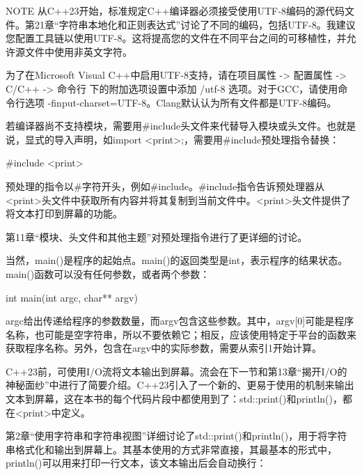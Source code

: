\begin{myNotic}{NOTE}
从C++23开始，标准规定C++编译器必须接受使用UTF-8编码的源代码文件。第21章“字符串本地化和正则表达式”讨论了不同的编码，包括UTF-8。我建议您配置工具链以使用UTF-8。这将提高您的文件在不同平台之间的可移植性，并允许源文件中使用非英文字符。

为了在Microsoft Visual C++中启用UTF-8支持，请在项目属性 -> 配置属性 -> C/C++ -> 命令行 下的附加选项设置中添加 /utf-8 选项。对于GCC，请使用命令行选项 -finput-charset=UTF-8。Clang默认认为所有文件都是UTF-8编码。
\end{myNotic}


若编译器尚不支持模块，需要用\#include头文件来代替导入模块或头文件。也就是说，显式的导入声明，如import <print>;，需要用\#include预处理指令替换：

\begin{cpp}
#include <print>
\end{cpp}

预处理的指令以\#字符开头，例如\#include。\#include指令告诉预处理器从<print>头文件中获取所有内容并将其复制到当前文件中。<print>头文件提供了将文本打印到屏幕的功能。

第11章“模块、头文件和其他主题”对预处理指令进行了更详细的讨论。


当然，main()是程序的起始点。main()的返回类型是int，表示程序的结果状态。main()函数可以没有任何参数，或者两个参数：

\begin{cpp}
int main(int argc, char** argv)
\end{cpp}

argc给出传递给程序的参数数量，而argv包含这些参数。其中，argv[0]可能是程序名称，也可能是空字符串，所以不要依赖它；相反，应该使用特定于平台的函数来获取程序名称。另外，包含在argv中的实际参数，需要从索引1开始计算。



C++23前，可使用I/O流将文本输出到屏幕。流会在下一节和第13章“揭开I/O的神秘面纱”中进行了简要介绍。C++23引入了一个新的、更易于使用的机制来输出文本到屏幕，这在本书的每个代码片段中都使用到了：std::print()和println()，都在<print>中定义。

第2章“使用字符串和字符串视图”详细讨论了std::print()和println()，用于将字符串格式化和输出到屏幕上。其基本使用的方式非常直接，其最基本的形式中，println()可以用来打印一行文本，该文本输出后会自动换行：


